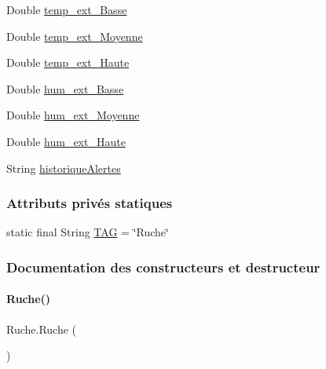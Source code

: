 \begin{DoxyCompactItemize}
\item 
Double \hyperlink{classfr_1_1campus_1_1laurainc_1_1honeybee_1_1_ruche_ad7171f31281b9e806b7622473bf5d8f1}{temp\+\_\+ext\+\_\+\+Basse}
\item 
Double \hyperlink{classfr_1_1campus_1_1laurainc_1_1honeybee_1_1_ruche_a254c5bb0927e07aebb85c811560eff98}{temp\+\_\+ext\+\_\+\+Moyenne}
\item 
Double \hyperlink{classfr_1_1campus_1_1laurainc_1_1honeybee_1_1_ruche_aa5737d305533c90c63a57fb567ed7eb4}{temp\+\_\+ext\+\_\+\+Haute}
\item 
Double \hyperlink{classfr_1_1campus_1_1laurainc_1_1honeybee_1_1_ruche_a6aea5ac6dffbcfdfb0a8596c177de0f6}{hum\+\_\+ext\+\_\+\+Basse}
\item 
Double \hyperlink{classfr_1_1campus_1_1laurainc_1_1honeybee_1_1_ruche_ad1f2d0608c7cbb7689254ef4ee70942a}{hum\+\_\+ext\+\_\+\+Moyenne}
\item 
Double \hyperlink{classfr_1_1campus_1_1laurainc_1_1honeybee_1_1_ruche_a4704dea77345a189a860088023a56726}{hum\+\_\+ext\+\_\+\+Haute}
\item 
String \hyperlink{classfr_1_1campus_1_1laurainc_1_1honeybee_1_1_ruche_a8befaea028a782bb0cec7b4934210183}{historique\+Alertes}
\end{DoxyCompactItemize}
\subsubsection*{Attributs privés statiques}
\begin{DoxyCompactItemize}
\item 
static final String \hyperlink{classfr_1_1campus_1_1laurainc_1_1honeybee_1_1_ruche_a44739cbb0fa7451c1edc240a3f51c257}{T\+AG} = \char`\"{}Ruche\char`\"{}
\end{DoxyCompactItemize}


\subsubsection{Documentation des constructeurs et destructeur}
\mbox{\label{classfr_1_1campus_1_1laurainc_1_1honeybee_1_1_ruche_a56ec53516e4f94b4f5e42f083fa345db}} 
\paragraph{\texorpdfstring{Ruche()}{Ruche()}\hspace{0.1cm}{\footnotesize\ttfamily [1/4]}}
{\footnotesize\ttfamily Ruche.\+Ruche (\begin{DoxyParamCaption}{ }\end{DoxyParamCaption})}

